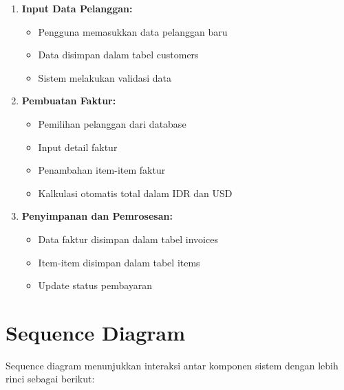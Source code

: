 \documentclass[a4paper]{report}
\begin{document}
\begin{enumerate}
\item \textbf{Input Data Pelanggan:}
    \begin{itemize}
    \item Pengguna memasukkan data pelanggan baru
    \item Data disimpan dalam tabel customers
    \item Sistem melakukan validasi data
    \end{itemize}

\item \textbf{Pembuatan Faktur:}
    \begin{itemize}
    \item Pemilihan pelanggan dari database
    \item Input detail faktur
    \item Penambahan item-item faktur
    \item Kalkulasi otomatis total dalam IDR dan USD
    \end{itemize}

\item \textbf{Penyimpanan dan Pemrosesan:}
    \begin{itemize}
    \item Data faktur disimpan dalam tabel invoices
    \item Item-item disimpan dalam tabel items
    \item Update status pembayaran
    \end{itemize}
\end{enumerate}

\section{Sequence Diagram}
\sloppy
Sequence diagram menunjukkan interaksi antar komponen sistem dengan lebih rinci sebagai 
berikut:
\end{document}
